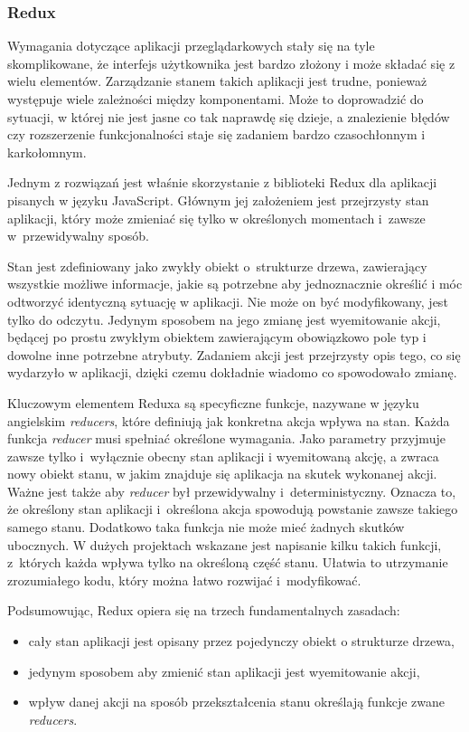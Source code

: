 \documentclass[11pt,a4paper,polish,thesis]{dcsbook}
\begin{document}
	\subsubsection{Redux}
	
	Wymagania dotyczące aplikacji przeglądarkowych stały się na tyle skomplikowane, że interfejs użytkownika jest bardzo złożony i może składać się z wielu elementów. Zarządzanie stanem takich aplikacji jest trudne, ponieważ występuje wiele zależności między komponentami. Może to doprowadzić do sytuacji, w której nie jest jasne co tak naprawdę się dzieje, a znalezienie błędów czy rozszerzenie funkcjonalności staje się zadaniem bardzo czasochłonnym i karkołomnym. 
	
	Jednym z rozwiązań jest właśnie skorzystanie z biblioteki Redux dla aplikacji pisanych w języku JavaScript. Głównym jej założeniem jest przejrzysty stan aplikacji, który może zmieniać się tylko w określonych momentach i~zawsze w~przewidywalny sposób. 
	
	Stan jest zdefiniowany jako zwykły obiekt o~strukturze drzewa, zawierający wszystkie możliwe informacje, jakie są potrzebne aby jednoznacznie określić i móc odtworzyć identyczną sytuację w aplikacji. Nie może on być modyfikowany, jest tylko do odczytu. Jedynym sposobem na jego zmianę jest wyemitowanie akcji, będącej po prostu zwykłym obiektem zawierającym obowiązkowo pole typ i dowolne inne potrzebne atrybuty.	Zadaniem akcji jest przejrzysty opis tego, co się wydarzyło w aplikacji, dzięki czemu dokładnie wiadomo co spowodowało zmianę. 
	
	Kluczowym elementem Reduxa są specyficzne funkcje, nazywane w języku angielskim \textit{reducers}, które definiują jak konkretna akcja wpływa na stan. Każda funkcja \textit{reducer} musi spełniać określone wymagania. Jako parametry przyjmuje zawsze tylko i~wyłącznie obecny stan aplikacji i wyemitowaną akcję, a zwraca nowy obiekt stanu, w jakim znajduje się aplikacja na skutek wykonanej akcji. Ważne jest także aby \textit{reducer} był przewidywalny i~deterministyczny. Oznacza to, że określony stan aplikacji i~określona akcja spowodują powstanie zawsze takiego samego stanu. Dodatkowo taka funkcja nie może mieć żadnych skutków ubocznych. W dużych projektach wskazane jest napisanie kilku takich funkcji, z~których każda wpływa tylko na określoną część stanu. Ułatwia to utrzymanie zrozumiałego kodu, który można łatwo rozwijać i~modyfikować.
	
	Podsumowując, Redux opiera się na trzech fundamentalnych zasadach:	
	\begin{itemize}
		\item cały stan aplikacji jest opisany przez pojedynczy obiekt o strukturze drzewa,
		\item jedynym sposobem aby zmienić stan aplikacji jest wyemitowanie akcji,
		\item wpływ danej akcji na sposób przekształcenia stanu określają funkcje zwane \textit{reducers}.
	\end{itemize}
\end{document}

